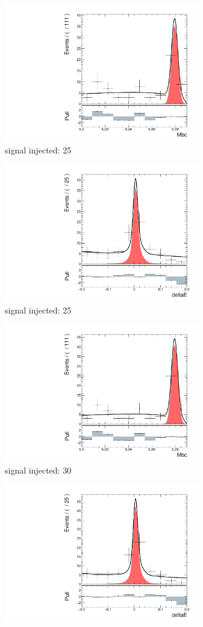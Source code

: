 \begin{figure}[htpb]
	\begin{subfigure}{0.5\linewidth}
		\includegraphics[page=1,height=6cm]{figures/injection_sig_25/ds_gen_Mbc_2D.pdf}
		\caption{signal injected: 25}
	\end{subfigure}
	\begin{subfigure}{0.5\linewidth}
		\includegraphics[page=1,height=6cm]{figures/injection_sig_25/ds_gen_deltaE_2D.pdf}
		\caption{signal injected: 25}
	\end{subfigure}
	\begin{subfigure}{0.5\linewidth}
		\includegraphics[page=1,height=6cm]{figures/injection_sig_30/ds_gen_Mbc_2D.pdf}
		\caption{signal injected: 30}
	\end{subfigure}
	\begin{subfigure}{0.5\linewidth}
		\includegraphics[page=1,height=6cm]{figures/injection_sig_30/ds_gen_deltaE_2D.pdf}

\end{subfigure}
\end{figure}
